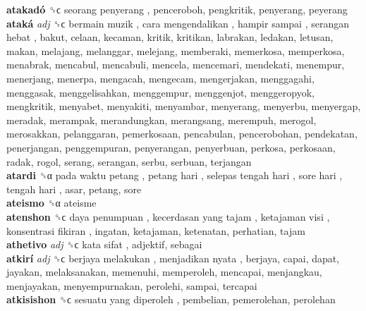 \textbf{atakadó} ␝ϲ   seorang penyerang , penceroboh, pengkritik, penyerang, peyerang  \\
\textbf{ataká} \emph{adj}  ␝ϲ   bermain muzik ,  cara mengendalikan ,  hampir sampai ,  serangan hebat , bakut, celaan, kecaman, kritik, kritikan, labrakan, ledakan, letusan, makan, melajang, melanggar, melejang, memberaki, memerkosa, memperkosa, menabrak, mencabul, mencabuli, mencela, mencemari, mendekati, menempur, menerjang, menerpa, mengacah, mengecam, mengerjakan, menggagahi, menggasak, menggelisahkan, menggempur, menggenjot, menggeropyok, mengkritik, menyabet, menyakiti, menyambar, menyerang, menyerbu, menyergap, meradak, merampak, merandungkan, merangsang, merempuh, merogol, merosakkan, pelanggaran, pemerkosaan, pencabulan, pencerobohan, pendekatan, penerjangan, penggempuran, penyerangan, penyerbuan, perkosa, perkosaan, radak, rogol, serang, serangan, serbu, serbuan, terjangan  \\
\textbf{atardi} ␝α   pada waktu petang ,  petang hari ,  selepas tengah hari ,  sore hari ,  tengah hari , asar, petang, sore  \\
\textbf{ateismo} ␝α  ateisme  \\
\textbf{atenshon} ␝ϲ   daya penumpuan ,  kecerdasan yang tajam ,  ketajaman visi ,  konsentrasi fikiran , ingatan, ketajaman, ketenatan, perhatian, tajam  \\
\textbf{athetivo} \emph{adj}  ␝ϲ   kata sifat , adjektif, sebagai  \\
\textbf{atkirí} \emph{adj}  ␝ϲ   berjaya melakukan ,  menjadikan nyata , berjaya, capai, dapat, jayakan, melaksanakan, memenuhi, memperoleh, mencapai, menjangkau, menjayakan, menyempurnakan, perolehi, sampai, tercapai  \\
\textbf{atkisishon} ␝ϲ   sesuatu yang diperoleh , pembelian, pemerolehan, perolehan  \\
